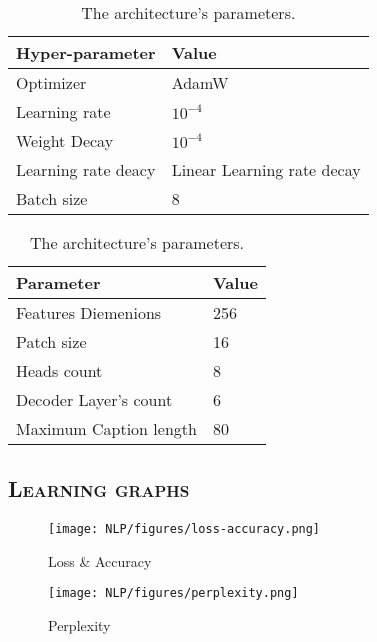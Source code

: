 \documentclass[a4paper,10pt]{article}
\begin{document}
\begin{table}[!htb]
    \begin{minipage}{.5\linewidth}
        \centering
        \begin{tabular}{|l|l|}
            \hline
            \textbf{Hyper-parameter} & \textbf{Value} \\
            \hline
            Optimizer & AdamW \\
            Learning rate & $10^{-4}$\\
            Weight Decay & $10^{-4}$ \\
            Learning rate deacy & Linear Learning rate decay\\
            Batch size & 8\\
            \hline
        \end{tabular}
        \caption{Hyper-parameters}
    \end{minipage}%
    \begin{minipage}{.5\linewidth}
        \centering
        \begin{tabular}{|l|l|}
            \hline
            \textbf{Parameter} & \textbf{Value} \\
            \hline
            Features Diemenions & 256\\
            Patch size & 16 \\
            Heads count & 8\\
            Decoder Layer's count & 6\\
            Maximum Caption length & 80 \\
            \hline
        \end{tabular}
        \caption{The architecture's parameters.}
    \end{minipage} 
\end{table}

\subsection{\scshape{Learning graphs}}

\begin{figure}[H]
    \centering
    \texttt{[image: NLP/figures/loss-accuracy.png]}
    \caption{Loss & Accuracy}
    \label{fig:enter-label}
\end{figure}

\begin{figure}[H]
    \centering
    \texttt{[image: NLP/figures/perplexity.png]}
    \caption{Perplexity}
\end{figure}
\end{document}
